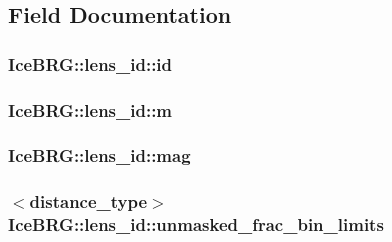 \subsection{Field Documentation}
\hypertarget{structIceBRG_1_1lens__id_afd7ce5f12f3675c0c63e2b741c177652}{
\subsubsection[{id}]{ Ice\-B\-R\-G\-::lens\-\_\-id\-::id}}\label{structIceBRG_1_1lens__id_afd7ce5f12f3675c0c63e2b741c177652}
\hypertarget{structIceBRG_1_1lens__id_af2551e9da4443bc56540c32dee75fbb5}{
\subsubsection[{m}]{ Ice\-B\-R\-G\-::lens\-\_\-id\-::m}}\label{structIceBRG_1_1lens__id_af2551e9da4443bc56540c32dee75fbb5}
\hypertarget{structIceBRG_1_1lens__id_a9685ba64aac6b662881132968034d32a}{
\subsubsection[{mag}]{ Ice\-B\-R\-G\-::lens\-\_\-id\-::mag}}\label{structIceBRG_1_1lens__id_a9685ba64aac6b662881132968034d32a}
\hypertarget{structIceBRG_1_1lens__id_a6a4f65e3e6e010a6d3ad0e27ba84ad9b}{
\subsubsection[{unmasked\-\_\-frac\-\_\-bin\-\_\-limits}]{$<${\bf distance\-\_\-type}$>$ Ice\-B\-R\-G\-::lens\-\_\-id\-::unmasked\-\_\-frac\-\_\-bin\-\_\-limits}}\label{structIceBRG_1_1lens__id_a6a4f65e3e6e010a6d3ad0e27ba84ad9b}
